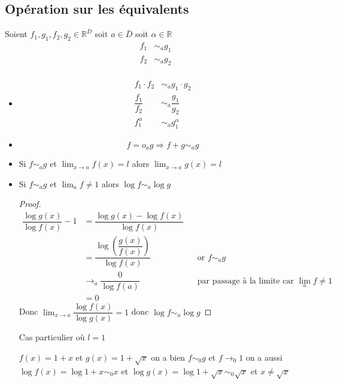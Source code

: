 \documentclass[11pt,colorlinks]{book}
\theoremstyle{mytheoremstyle}
\theoremstyle{mytheoremstyle}
\theoremstyle{mytheoremstyle}
\theoremstyle{mytheoremstyle}
\theoremstyle{mytheoremstyle}
\theoremstyle{mytheoremstyle}
\theoremstyle{mytheoremstyle}
\theoremstyle{mytheoremstyle}
\theoremstyle{myproblemstyle}
\def\mbb#1{\mathbb{#1}}
\def\bR{\mbb{R}}
\renewcommand{\equiv}{\sim}
\begin{document}
    \subsection{Opération sur les équivalents}
    Soient $f_1,g_1,f_2,g_2 \in \bR^D$ soit $a \in \bar{D}$ soit $\alpha \in \bR$ 
    \begin{align*}
      f_1 &\equiv_{a} g_1 \\ 
      f_2 &\equiv_{a} g_2 \\
    \end{align*}
    \begin{itemize}
      \item \begin{align*}
      f_1 \cdot f_2 &\equiv_{a} g_1 \cdot g_2 \\ 
      \dfrac{f_1}{f_2} &\equiv_{a} \dfrac{g_1}{g_2} \\
      f_1^\alpha &\equiv_{a} g_1^\alpha
    \end{align*}
    \item \begin{equation}
      f = o_{a} g \Rightarrow f + g \equiv_{a} g 
    \end{equation}
    \item Si $f \equiv_{a} g$ et $\lim_{x \to a} f(x) = l$ alors $\lim_{x \to a} g(x) = l$
    \item \begin{prop}
      Si $f \equiv_a g$ et $\lim_a f \not= 1$ alors $\log f \equiv_a \log g$
      \begin{proof}
        \begin{align*}
          \dfrac{\log g(x)}{\log f(x)} - 1 &= \dfrac{\log g(x) - \log f(x)}{\log f(x)} \\
          &= \dfrac{\log \left(\dfrac{g(x)}{f(x)}\right)}{\log f(x)} && \text{or } f \equiv_a g \\
          &\to_{a} \dfrac{0}{\log f(a)} && \text{par passage à la limite car } \lim_a f \not= 1 \\
          &= 0
        \end{align*}
        Donc $\lim_{x \to a} \dfrac{\log f(x)}{\log g(x)} = 1$ donc $\log f \equiv_a \log g$
      \end{proof}
    \end{prop}
    Cas particulier où $l=1$ 
    \begin{ex}
      $f(x) = 1+x$ et $g(x) = 1 + \sqrt{x}$ on a bien $f \equiv_0 g$ et $f \to_0 1$ 
      on a aussi $\log f(x) = \log 1+x \equiv_0 x$ et $\log g(x) = \log 1+\sqrt{x} \equiv_0 \sqrt{x}$ et $x \not= \sqrt{x}$
    \end{ex}
  \end{itemize}
\end{document}
